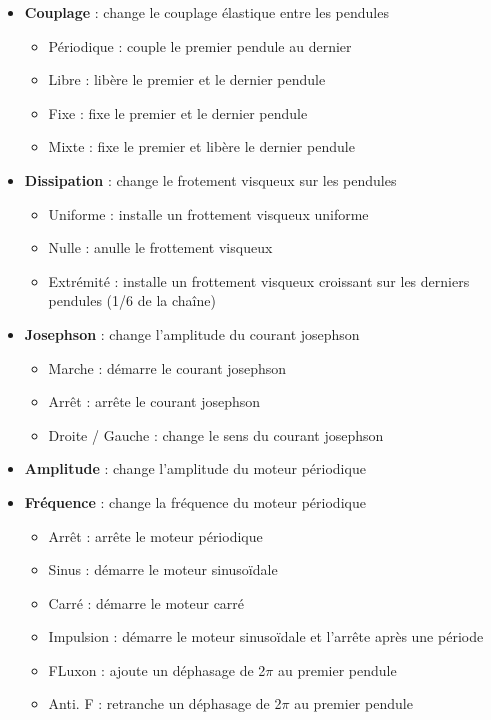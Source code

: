 \begin{itemize}[leftmargin=1cm, label=, itemsep=0pt]
	\item {\bf Couplage} : change le couplage élastique entre les pendules
	\begin{itemize}[leftmargin=1cm, label=, itemsep=0pt]
		\item Périodique : couple le premier pendule au dernier
		\item Libre : libère le premier et le dernier pendule
		\item Fixe : fixe le premier et le dernier pendule
		\item Mixte : fixe le premier et libère le dernier pendule
	\end{itemize}
	\item {\bf Dissipation} : change le frotement visqueux sur les pendules
	\begin{itemize}[leftmargin=1cm, label=, itemsep=0pt]
		\item Uniforme : installe un frottement visqueux uniforme
		\item Nulle : anulle le frottement visqueux
		\item Extrémité : installe un frottement visqueux croissant sur les derniers pendules (1/6 de la chaîne)
	\end{itemize}
	\item {\bf Josephson} : change l'amplitude du courant josephson
	\begin{itemize}[leftmargin=1cm, label=, itemsep=0pt]
		\item Marche : démarre le courant josephson
		\item Arrêt : arrête le courant josephson
		\item Droite / Gauche : change le sens du courant josephson
	\end{itemize}
	\item {\bf Amplitude} : change l'amplitude du moteur périodique
	\item {\bf Fréquence} : change la fréquence du moteur périodique
	\begin{itemize}[leftmargin=1cm, label=, itemsep=0pt]
		\item Arrêt : arrête le moteur périodique
		\item Sinus : démarre le moteur sinusoïdale
		\item Carré : démarre le moteur carré
		\item Impulsion : démarre le moteur sinusoïdale et l'arrête après une période
	\end{itemize}
	\begin{itemize}[leftmargin=1cm, label=, itemsep=0pt]
		\item FLuxon : ajoute un déphasage de 2$\pi$ au premier pendule
		\item Anti. F : retranche un déphasage de 2$\pi$ au premier pendule
	\end{itemize}
\end{itemize}
%
%
